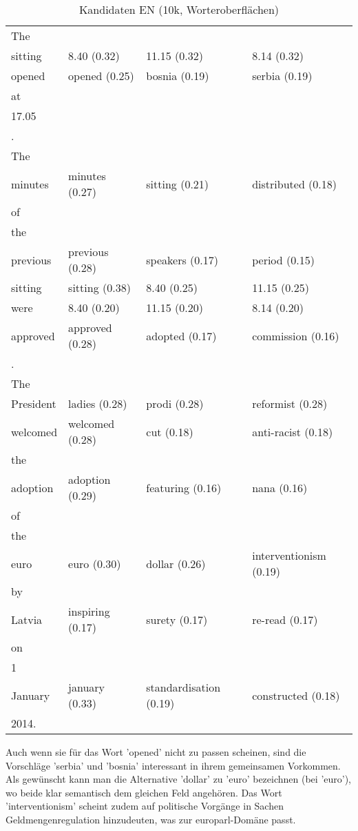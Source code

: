 \documentclass[11pt,twoside,openright]{mpreport}
\begin{document}
\begin{table}[H]
\hspace{-0cm}\begin{footnotesize}\begin{tabular}{|llll|}
\hline
The & & & \\
sitting                 & 8.40 (0.32) & 11.15 (0.32) & 8.14 (0.32) \\
opened                  & opened (0.25) & bosnia (0.19) & serbia (0.19) \\
at & & & \\
17.05 & & & \\
. & & & \\
The & & & \\
minutes                 & minutes (0.27) & sitting (0.21) & distributed (0.18) \\
of & & & \\
the & & & \\
previous                & previous (0.28) & speakers (0.17) & period (0.15) \\
sitting                 & sitting (0.38) & 8.40 (0.25) & 11.15 (0.25) \\
were                    & 8.40 (0.20) & 11.15 (0.20) & 8.14 (0.20) \\
approved                & approved (0.28) & adopted (0.17) & commission (0.16) \\
. & & & \\
The & & & \\
President               & ladies (0.28) & prodi (0.28) & reformist (0.28) \\
welcomed                & welcomed (0.28) & cut (0.18) & anti-racist (0.18) \\
the & & & \\
adoption                & adoption (0.29) & featuring (0.16) & nana (0.16) \\
of & & & \\
the & & & \\
euro                    & euro (0.30) & dollar (0.26) & interventionism (0.19) \\
by & & & \\
Latvia                  & inspiring (0.17) & surety (0.17) & re-read (0.17) \\
on & & & \\
1 & & & \\
January                 & january (0.33) & standardisation (0.19) & constructed (0.18) \\
2014. & & & \\
\hline
\end{tabular}\end{footnotesize}
\caption{Kandidaten EN (10k, Worteroberflächen)}
\end{table}
Auch wenn sie für das Wort 'opened' nicht zu passen scheinen, sind die Vorschläge 'serbia' und 'bosnia' interessant in ihrem gemeinsamen Vorkommen. Als gewünscht kann man die Alternative 'dollar' zu 'euro' bezeichnen (bei 'euro'), wo beide klar semantisch dem gleichen Feld angehören. Das Wort
'interventionism' scheint zudem auf politische Vorgänge in Sachen Geldmengenregulation hinzudeuten, was zur europarl-Domäne passt.
\end{document}
